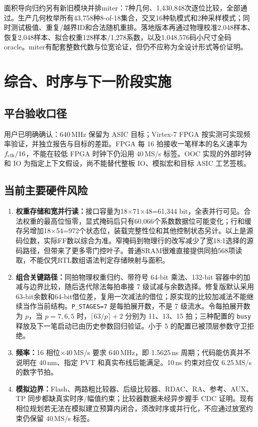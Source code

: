 \documentclass[UTF8,fontset=fandol,11pt,a4paper,openany]{ctexrep}
\newcommand{\code}[1]{\nolinkurl{#1}}
\begin{document}
面积导向归约另有新旧模块并排miter：7种几何、1,430,848次逐位比较，全部通过。生产几何枚举所有43,758种8-of-18集合，交叉16种轨模式和2种采样模式；同时测试极值、重复/越界ID和合法随机重排。落地版本再通过物理校准2,048样本、恢复2,048样本、拟合权重128样本/1,278系数，以及1,048,576码小尺寸全码oracle。miter有配套整数代数与位宽论证，但仍不应称为全设计形式等价证明。




\chapter{综合、时序与下一阶段实施}
\section{平台验收口径}
用户已明确确认：640\,MHz 保留为 ASIC 目标；Virtex-7 FPGA 按实测可实现频率验证，并独立报告与目标的差距。FPGA 每 16 拍接收一笔样本的名义速率为 \(f_{\rm clk}/16\)，不能在较低 FPGA 时钟下仍沿用 40\,MS/s 标签。OOC 实现的外部时钟和 IO 为指定上下文假设，尚不能替代整板 IO、模拟宏和目标 ASIC 工艺签核。

\section{当前主要硬件风险}
\begin{enumerate}
\item \textbf{权重存储和宽并行读：}接口容量为18$\times$71$\times$48=61,344 bit，全表并行可见。合法权重的最高位恒零，显式掩码后只有60,066个系数数据位可能变化；行和缓存另增加18$\times$54=972个状态位，装载完整性位和其他控制状态另计。以上是源码位数，实际FF数以综合为准。窄掩码到物理行的改写减少了宽18:1选择的源码路径，但带来了更多零门控叶子。普通SRAM很难直接提供同拍568项读取，不能仅凭RTL数组语法判定存储映射与面积。
\item \textbf{组合关键路径：}同拍物理权重归约、带符号 64-bit 乘法、132-bit 容器中的加减与边界比较，随后迭代除法每拍串接 7 级试减与余数选择。修复版默认采用63-bit余数和64-bit借位差，复用一次减法的借位；原实现的比较加减法不能继续当作当前结构。\code{P_STAGES=7} 是每拍展开数，不是 7 级流水。令每拍展开数为 \(p\)，当 \(p=7,6,5\) 时，\(\lceil63/p\rceil+2\) 分别为 11、13、15 拍；三种配置的 \code{busy} 释放及下一笔启动已由历史参数回归验证。小于 5 的配置已被顶层参数守卫拒绝。
\item \textbf{频率：}16 相位$\times$40\,MS/s 要求 640\,MHz，即 1.5625\,ns 周期；代码能仿真并不说明在 40\,nm、指定 PVT 和真实布线后能满足。10\,ns 约束对应仅 6.25\,MS/s 的数字节拍。
\item \textbf{模拟边界：}Flash、两路粗比较器、后级比较器、RDAC、RA、参考、AUX、TP 同步都缺真实时序/幅值约束；比较器数据未经异步握手 CDC 证明。现有相位规划若无法在模拟建立预算内闭合，须改时序或并行化，不应通过放宽约束仍保留 40\,MS/s 标签。
\end{enumerate}
\end{document}
